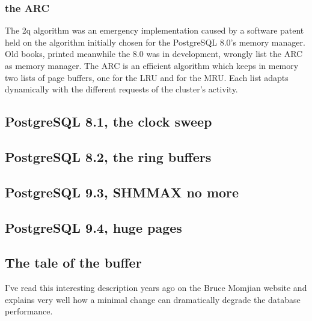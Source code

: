 \subsubsection{the ARC}
The 2q algorithm was an emergency implementation caused by a software patent held on the algorithm initially 
chosen for the PostgreSQL 8.0's memory manager. Old books, printed meanwhile the 8.0 was in development, 
wrongly list the ARC as memory manager. The ARC is an efficient algorithm which keeps in memory two 
lists of page buffers, one for the LRU and for the MRU. Each list adapts dynamically with the different requests 
of the cluster's activity. 

\subsection{PostgreSQL 8.1, the clock sweep}

\subsection{PostgreSQL 8.2, the ring buffers}

\subsection{PostgreSQL 9.3, SHMMAX no more}

\subsection{PostgreSQL 9.4, huge pages}

\subsection{The tale of the buffer}
I've read this interesting description years ago on the Bruce Momjian website and explains very well how a 
minimal change can dramatically degrade the database performance.\newline

